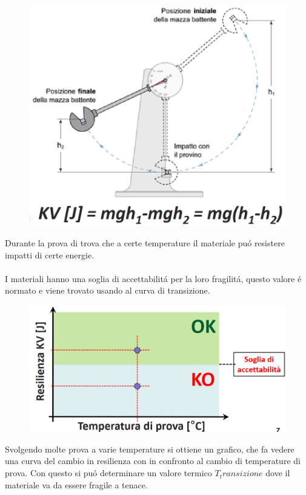 \documentclass{article}
\begin{document}
{\begin{figure}[!h]
                        \includegraphics[width=.85\linewidth]{Diagramma e equazione per la prova charpy.png}
                    \end{figure}
                    Durante la prova di trova che a certe temperature il materiale pu\'o resistere impatti di certe energie. \\ \\
                    \newpage
                    I materiali hanno una soglia di accettabilit\'a per la loro fragilit\'a, questo valore \'e normato e viene trovato usando al curva di transizione.
                    \begin{figure}[!h]
                        \centering
                        \includegraphics[width=.85\linewidth]{Diagramma per la Resilienza in confronto alla temperatura di prova.png}
                    \end{figure}
                    Svolgendo molte prova a varie temperature si ottiene un grafico, che fa vedere una curva del cambio in resilienza con in confronto al cambio di temperature di prova. Con questo si pu\'o determinare un valore termico $T_transizione$ dove il materiale va da essere fragile a tenace. \newpage
}
\end{document}
